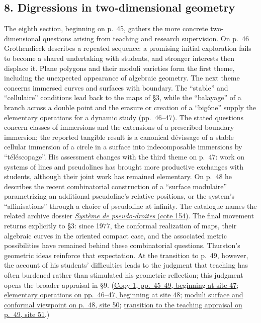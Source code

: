 \subsection*{8. Digressions in two-dimensional geometry}
The eighth section, beginning on p.~45, gathers the more concrete
two-dimensional questions arising from teaching and research supervision.
On p.~46 Grothendieck describes a repeated sequence: a promising initial
exploration fails to become a shared undertaking with students, and
stronger interests then displace it. Plane polygons and their moduli
varieties form the first theme, including the unexpected appearance of
algebraic geometry. The next theme concerns immersed curves and surfaces
with boundary. The ``stable'' and ``cellulaire'' conditions lead back to
the maps of \S3, while the ``balayage'' of a branch across a double point
and the erasure or creation of a ``bigône'' supply the elementary
operations for a dynamic study (pp.~46--47). The stated questions concern
classes of immersions and the extensions of a prescribed boundary
immersion; the reported tangible result is a canonical dévissage of a
stable cellular immersion of a circle in a surface into indecomposable
immersions by ``téléscopage''. His assessment changes with
the third theme on p.~47: work on systems of lines and pseudolines has
brought more productive exchanges with students, although their joint
work has remained elementary. On p.~48 he describes the recent
combinatorial construction of a ``surface modulaire'' parametrizing an
additional pseudoline's relative positions, or the system's
``affinisations'' through a choice of pseudoline at infinity. The
catalogue names the related archive dossier
\href{https://grothendieck.umontpellier.fr/archives-grothendieck/}{\emph{Système de pseudo-droites} (cote 154)}.
The final movement returns explicitly to \S3: since 1977, the conformal
realization of maps, their algebraic curves in the oriented compact case,
and the associated metric possibilities have remained behind these
combinatorial questions. Thurston's geometric ideas reinforce that
expectation. At the transition to p.~49, however, the account of his
students' difficulties leads to the judgment that teaching has often
burdened rather than stimulated his geometric reflection; this judgment
opens the broader appraisal in \S9.
(\href{https://grothendieck.umontpellier.fr/web/viewer.html?file=../119.pdf\#page=48}{Copy 1, pp.~45--49, beginning at site 47};
\href{https://grothendieck.umontpellier.fr/web/viewer.html?file=../119.pdf\#page=49}{elementary operations on pp.~46--47, beginning at site 48};
\href{https://grothendieck.umontpellier.fr/web/viewer.html?file=../119.pdf\#page=51}{moduli surface and conformal viewpoint on p.~48, site 50};
\href{https://grothendieck.umontpellier.fr/web/viewer.html?file=../119.pdf\#page=52}{transition to the teaching appraisal on p.~49, site 51}.)
